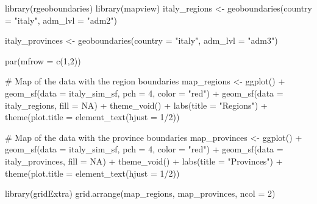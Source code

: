 \documentclass[
  letterpaper,
]{krantz}
\newenvironment{Shaded}{\begin{snugshade}}{\end{snugshade}}
\newcommand{\AttributeTok}[1]{\textcolor[rgb]{0.40,0.45,0.13}{#1}}
\newcommand{\CommentTok}[1]{\textcolor[rgb]{0.37,0.37,0.37}{#1}}
\newcommand{\ConstantTok}[1]{\textcolor[rgb]{0.56,0.35,0.01}{#1}}
\newcommand{\DecValTok}[1]{\textcolor[rgb]{0.68,0.00,0.00}{#1}}
\newcommand{\FunctionTok}[1]{\textcolor[rgb]{0.28,0.35,0.67}{#1}}
\newcommand{\NormalTok}[1]{\textcolor[rgb]{0.00,0.23,0.31}{#1}}
\newcommand{\OtherTok}[1]{\textcolor[rgb]{0.00,0.23,0.31}{#1}}
\newcommand{\SpecialCharTok}[1]{\textcolor[rgb]{0.37,0.37,0.37}{#1}}
\newcommand{\StringTok}[1]{\textcolor[rgb]{0.13,0.47,0.30}{#1}}
\begin{document}
\begin{Shaded}
\begin{Highlighting}[]
\FunctionTok{library}\NormalTok{(rgeoboundaries)}
\FunctionTok{library}\NormalTok{(mapview)}
\NormalTok{italy\_regions }\OtherTok{\textless{}{-}} \FunctionTok{geoboundaries}\NormalTok{(}\AttributeTok{country =} \StringTok{"italy"}\NormalTok{, }\AttributeTok{adm\_lvl =} \StringTok{"adm2"}\NormalTok{)}

\NormalTok{italy\_provinces }\OtherTok{\textless{}{-}} \FunctionTok{geoboundaries}\NormalTok{(}\AttributeTok{country =} \StringTok{"italy"}\NormalTok{, }\AttributeTok{adm\_lvl =} \StringTok{"adm3"}\NormalTok{)}

\FunctionTok{par}\NormalTok{(}\AttributeTok{mfrow =} \FunctionTok{c}\NormalTok{(}\DecValTok{1}\NormalTok{,}\DecValTok{2}\NormalTok{))}

\CommentTok{\# Map of the data with the region boundaries}
\NormalTok{map\_regions }\OtherTok{\textless{}{-}} \FunctionTok{ggplot}\NormalTok{() }\SpecialCharTok{+} 
\FunctionTok{geom\_sf}\NormalTok{(}\AttributeTok{data =}\NormalTok{ italy\_sim\_sf, }\AttributeTok{pch =} \DecValTok{4}\NormalTok{, }\AttributeTok{color =} \StringTok{"red"}\NormalTok{) }\SpecialCharTok{+} 
\FunctionTok{geom\_sf}\NormalTok{(}\AttributeTok{data =}\NormalTok{ italy\_regions, }\AttributeTok{fill =} \ConstantTok{NA}\NormalTok{) }\SpecialCharTok{+} 
\FunctionTok{theme\_void}\NormalTok{() }\SpecialCharTok{+}
\FunctionTok{labs}\NormalTok{(}\AttributeTok{title =} \StringTok{"Regions"}\NormalTok{) }\SpecialCharTok{+}
\FunctionTok{theme}\NormalTok{(}\AttributeTok{plot.title =} \FunctionTok{element\_text}\NormalTok{(}\AttributeTok{hjust =} \DecValTok{1}\SpecialCharTok{/}\DecValTok{2}\NormalTok{))}

\CommentTok{\# Map of the data with the province boundaries}
\NormalTok{map\_provinces }\OtherTok{\textless{}{-}} \FunctionTok{ggplot}\NormalTok{() }\SpecialCharTok{+} 
\FunctionTok{geom\_sf}\NormalTok{(}\AttributeTok{data =}\NormalTok{ italy\_sim\_sf, }\AttributeTok{pch =} \DecValTok{4}\NormalTok{, }\AttributeTok{color =} \StringTok{"red"}\NormalTok{) }\SpecialCharTok{+} 
\FunctionTok{geom\_sf}\NormalTok{(}\AttributeTok{data =}\NormalTok{ italy\_provinces, }\AttributeTok{fill =} \ConstantTok{NA}\NormalTok{) }\SpecialCharTok{+} 
\FunctionTok{theme\_void}\NormalTok{() }\SpecialCharTok{+}
\FunctionTok{labs}\NormalTok{(}\AttributeTok{title =} \StringTok{"Provinces"}\NormalTok{) }\SpecialCharTok{+}
\FunctionTok{theme}\NormalTok{(}\AttributeTok{plot.title =} \FunctionTok{element\_text}\NormalTok{(}\AttributeTok{hjust =} \DecValTok{1}\SpecialCharTok{/}\DecValTok{2}\NormalTok{))}

\FunctionTok{library}\NormalTok{(gridExtra)}
\FunctionTok{grid.arrange}\NormalTok{(map\_regions, map\_provinces, }\AttributeTok{ncol =} \DecValTok{2}\NormalTok{)}
\end{Highlighting}
\end{Shaded}
\end{document}
